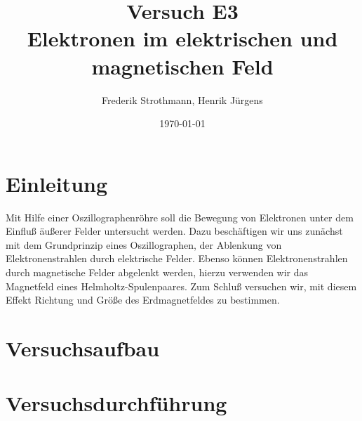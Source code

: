 \documentclass[12pt]{scrartcl}
\title{Versuch E3\\ Elektronen im elektrischen und magnetischen Feld}
\author{Frederik Strothmann, Henrik Jürgens}
\date{\today}
\begin{document}

\maketitle
\tableofcontents
\newpage


\section{Einleitung}
Mit Hilfe einer Oszillographenröhre soll die Bewegung von Elektronen unter dem Einfluß äußerer Felder untersucht werden. Dazu beschäftigen wir uns zunächst mit dem Grundprinzip eines Oszillographen, der Ablenkung von Elektronenstrahlen durch elektrische Felder. Ebenso können Elektronenstrahlen durch magnetische Felder abgelenkt werden, hierzu verwenden wir das Magnetfeld eines Helmholtz-Spulenpaares. Zum Schluß versuchen wir, mit diesem Effekt Richtung und Größe des Erdmagnetfeldes zu bestimmen.


\section{Versuchsaufbau}


\section{Versuchsdurchführung}
\end{document}
